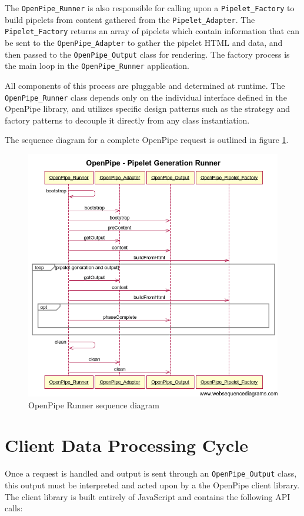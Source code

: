 \documentclass[12pt]{report}
\begin{document}
The \texttt{OpenPipe\_Runner} is also responsible for calling upon a \texttt{Pipelet\_Factory} to build pipelets from content gathered from the \texttt{Pipelet\_Adapter}. The \texttt{Pipelet\_Factory} returns an array of pipelets which contain information that can be sent to the \texttt{OpenPipe\_Adapter} to gather the pipelet HTML and data, and then passed to the \texttt{OpenPipe\_Output} class for rendering. The factory process is the main loop in the \texttt{OpenPipe\_Runner} application.

All components of this process are pluggable and determined at runtime. The \texttt{OpenPipe\_Runner} class depends only on the individual interface defined in the OpenPipe library, and utilizes specific design patterns such as the strategy and factory patterns to decouple it directly from any class instantiation.

The sequence diagram for a complete OpenPipe request is outlined in figure \ref{fig:openPipeRunnerSequenceDiagram}.

\begin{figure}[H]
\centering
\includegraphics[width=\textwidth,keepaspectratio]{figures/images/openpipe_runner.png}
\caption{OpenPipe Runner sequence diagram}
\label{fig:openPipeRunnerSequenceDiagram}
\end{figure}

\section{Client Data Processing Cycle}
Once a request is handled and output is sent through an \texttt{OpenPipe\_Output} class, this output must be interpreted and acted upon by a the OpenPipe client library.  The client library is built entirely of JavaScript and contains the following API calls:
\end{document}
